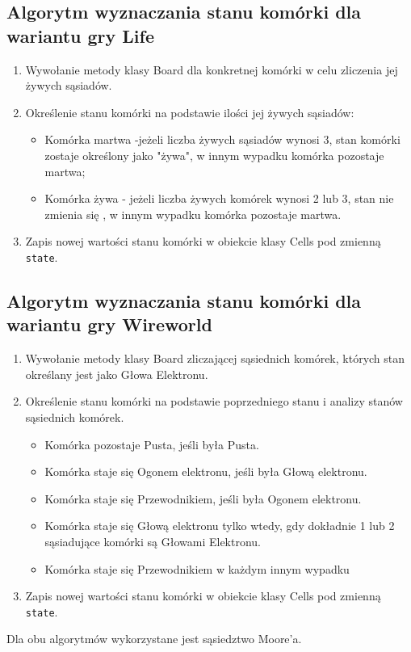 \documentclass[10pt, oneside]{article}
\begin{document}
\subsection{ Algorytm wyznaczania stanu komórki dla wariantu gry Life}
	\begin {enumerate}
	\item Wywołanie metody klasy Board dla konkretnej komórki w celu zliczenia jej żywych sąsiadów.
	\item Określenie stanu komórki na podstawie ilości jej żywych sąsiadów:
		\begin{itemize}
		\item Komórka martwa -jeżeli  liczba żywych sąsiadów wynosi 3, stan komórki zostaje określony jako "żywa", w innym wypadku komórka pozostaje martwa;
		\item Komórka żywa - jeżeli liczba żywych komórek wynosi 2 lub 3, stan nie zmienia się , w innym wypadku komórka pozostaje martwa.
		\end{itemize}
	\item Zapis nowej wartości stanu komórki w obiekcie klasy Cells pod zmienną \texttt{state}.
	\end {enumerate}


\subsection { Algorytm wyznaczania stanu komórki dla wariantu gry Wireworld}
	\begin {enumerate}
		\item Wywołanie metody klasy Board zliczającej sąsiednich komórek, których stan określany jest jako Głowa Elektronu. 
		\item Określenie stanu komórki na podstawie poprzedniego stanu i analizy stanów sąsiednich komórek.
		\begin{itemize}
		\item Komórka pozostaje Pusta, jeśli była Pusta.
		\item Komórka staje się Ogonem elektronu, jeśli była Głową elektronu.
		\item Komórka staje się Przewodnikiem, jeśli była Ogonem elektronu.
		\item Komórka staje się Głową elektronu tylko wtedy, gdy dokładnie 1 lub 2 sąsiadujące komórki są Głowami Elektronu.
		\item Komórka staje się Przewodnikiem w każdym innym wypadku
	\end{itemize}
	\item Zapis nowej wartości stanu komórki w obiekcie klasy Cells pod zmienną \texttt{state}.
	
\end {enumerate}
Dla obu algorytmów wykorzystane jest sąsiedztwo Moore'a. 
\end{document}
